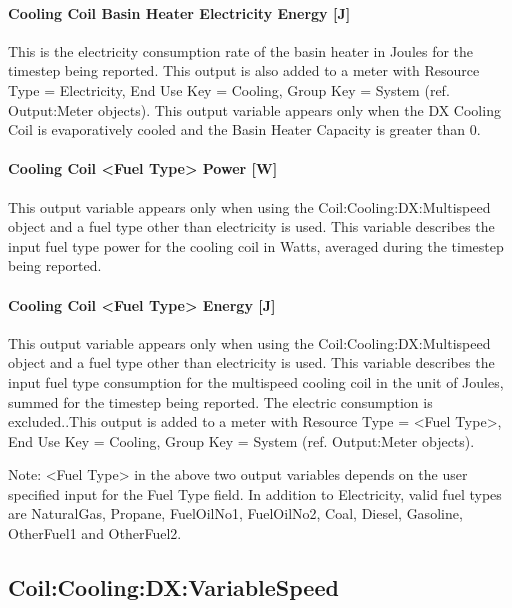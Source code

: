 \paragraph{Cooling Coil Basin Heater Electricity Energy {[}J{]}}\label{cooling-coil-basin-heater-electric-energy-j}

This is the electricity consumption rate of the basin heater in Joules for the timestep being reported. This output is also added to a meter with Resource Type = Electricity, End Use Key = Cooling, Group Key = System (ref. Output:Meter objects). This output variable appears only when the DX Cooling Coil is evaporatively cooled and the Basin Heater Capacity is greater than 0.

\paragraph{Cooling Coil \textless{}Fuel Type\textgreater{} Power {[}W{]}}\label{cooling-coil-fuel-type-power-w}

This output variable appears only when using the Coil:Cooling:DX:Multispeed object and a fuel type other than electricity is used. This variable describes the input fuel type power for the cooling coil in Watts, averaged during the timestep being reported.

\paragraph{Cooling Coil \textless{}Fuel Type\textgreater{} Energy {[}J{]}}\label{cooling-coil-fuel-type-energy-j}

This output variable appears only when using the Coil:Cooling:DX:Multispeed object and a fuel type other than electricity is used. This variable describes the input fuel type consumption for the multispeed cooling coil in the unit of Joules, summed for the timestep being reported. The electric consumption is excluded..This output is added to a meter with Resource Type = \textless{}Fuel Type\textgreater{}, End Use Key = Cooling, Group Key = System (ref. Output:Meter objects).

Note: \textless{}Fuel Type\textgreater{} in the above two output variables depends on the user specified input for the Fuel Type field. In addition to Electricity, valid fuel types are NaturalGas, Propane, FuelOilNo1, FuelOilNo2, Coal, Diesel, Gasoline, OtherFuel1 and OtherFuel2.

\subsection{Coil:Cooling:DX:VariableSpeed}\label{coilcoolingdxvariablespeed}

